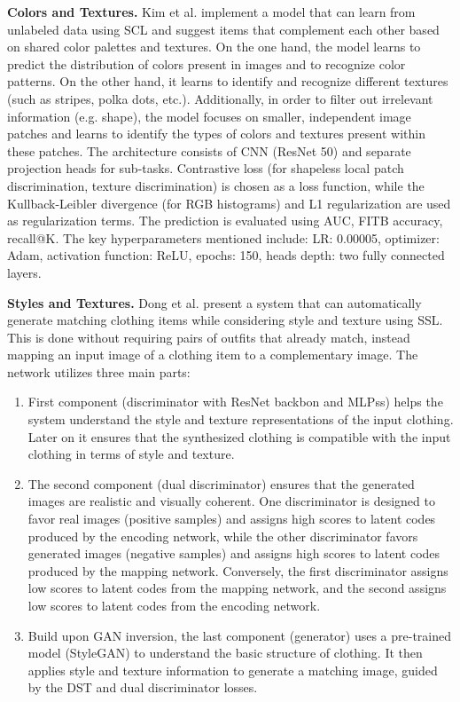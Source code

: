 \textbf{Colors and Textures.}
Kim et al. implement a model that can learn from unlabeled data using \acs{SCL} and suggest items that complement each other based on shared color palettes and textures. On the one hand, the model learns to predict the distribution of colors present in images and to recognize color patterns. On the other hand, it learns to identify and recognize different textures (such as stripes, polka dots, etc.). Additionally, in order to filter out irrelevant information (e.g. shape), the model focuses on smaller, independent image patches and learns to identify the types of colors and textures present within these patches. The architecture consists of \acs{CNN} (\acs{ResNet} 50) and separate projection heads for sub-tasks. Contrastive loss (for shapeless local patch discrimination, texture discrimination) is chosen as a loss function, while the Kullback-Leibler divergence (for RGB histograms) and L1 regularization are used as regularization terms. The prediction is evaluated using \acs{AUC}, \acs{FITB} accuracy, recall@K. The key hyperparameters mentioned include: \acs{LR}: 0.00005, optimizer: Adam, activation function: \acs{ReLU}, epochs: 150, heads depth: two fully connected layers. \cite[vgl.]{kim_self-supervised_2020}

\vspace{5mm}

\textbf{Styles and Textures.}
Dong et al. present a system that can automatically generate matching clothing items while considering style and texture using \acs{SSL}. This is done without requiring pairs of outfits that already match, instead mapping an input image of a clothing item to a complementary image. The network utilizes three main parts: \cite[vgl.]{dong_towards_2025}
\begin{enumerate}
  \item First component (discriminator with \acs{ResNet} backbon and \acsp{MLPs}) helps the system understand the style and texture representations of the input clothing. Later on it ensures that the synthesized clothing is compatible with the input clothing in terms of style and texture.
  \item The second component (dual discriminator) ensures that the generated images are realistic and visually coherent. One discriminator is designed to favor real images (positive samples) and assigns high scores to latent codes produced by the encoding network, while the other discriminator favors generated images (negative samples) and assigns high scores to latent codes produced by the mapping network. Conversely, the first discriminator assigns low scores to latent codes from the mapping network, and the second assigns low scores to latent codes from the encoding network.
  \item Build upon \acs{GAN} inversion, the last component (generator) uses a pre-trained model (StyleGAN) to understand the basic structure of clothing. It then applies style and texture information to generate a matching image, guided by the DST and dual discriminator losses.
\end{enumerate}

